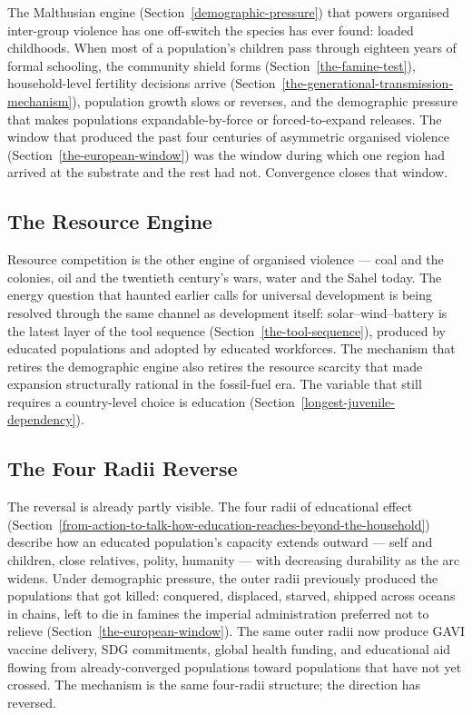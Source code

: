 \documentclass[12pt,letterpaper]{article}
\begin{document}
The Malthusian engine (Section~\ref{demographic-pressure}) that powers
organised inter-group violence has one off-switch the species has ever
found: loaded childhoods. When most of a population's children pass
through eighteen years of formal schooling, the community shield
forms (Section~\ref{the-famine-test}), household-level fertility
decisions arrive
(Section~\ref{the-generational-transmission-mechanism}), population
growth slows or reverses, and the demographic pressure that makes
populations expandable-by-force or forced-to-expand releases. The
window that produced the past four centuries of asymmetric organised
violence (Section~\ref{the-european-window}) was the window during
which one region had arrived at the substrate and the rest had not.
Convergence closes that window.

\subsection{The Resource Engine}\label{the-resource-engine}

Resource competition is the other engine of organised violence ---
coal and the colonies, oil and the twentieth century's wars, water
and the Sahel today. The energy question that haunted earlier calls
for universal development is being resolved through the same channel
as development itself: solar--wind--battery is the latest layer of
the tool sequence (Section~\ref{the-tool-sequence}), produced by
educated populations and adopted by educated workforces. The
mechanism that retires the demographic engine also retires the
resource scarcity that made expansion structurally rational in the
fossil-fuel era. The variable that still requires a country-level
choice is education
(Section~\ref{longest-juvenile-dependency}).

\subsection{The Four Radii Reverse}\label{the-four-radii-reverse}

The reversal is already partly visible. The four radii of educational
effect
(Section~\ref{from-action-to-talk-how-education-reaches-beyond-the-household})
describe how an educated population's capacity extends outward ---
self and children, close relatives, polity, humanity --- with
decreasing durability as the arc widens. Under demographic pressure,
the outer radii previously produced the populations that got killed:
conquered, displaced, starved, shipped across oceans in chains, left
to die in famines the imperial administration preferred not to
relieve (Section~\ref{the-european-window}). The same outer radii now
produce GAVI vaccine delivery, SDG commitments, global health funding,
and educational aid flowing from already-converged populations toward
populations that have not yet crossed. The mechanism is the same
four-radii structure; the direction has reversed.
\end{document}

